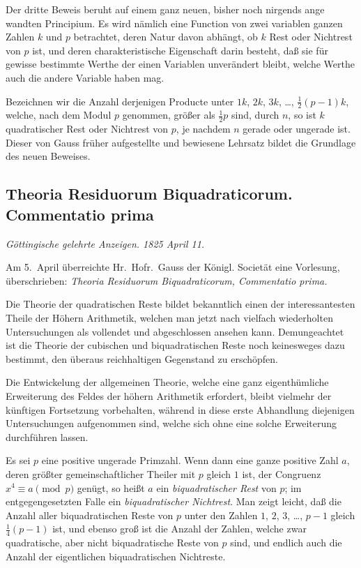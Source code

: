 \documentclass[12pt,a4paper]{article}
\theoremstyle{plain}
\theoremstyle{definition}
\theoremstyle{remark}
\begin{document}
Der dritte Beweis beruht auf einem ganz neuen, bisher noch nirgends ange wandten Principium. Es wird nämlich eine Function von zwei variablen ganzen Zahlen $k$ und $p$ betrachtet, deren Natur davon abhängt, ob $k$ Rest oder Nichtrest von $p$ ist, und deren charakteristische Eigenschaft darin besteht, daß sie für gewisse bestimmte Werthe der einen Variablen unverändert bleibt, welche Werthe auch die andere Variable haben mag.

Bezeichnen wir die Anzahl derjenigen Producte unter $1k$, $2k$, $3k$, \ldots, $\frac{1}{2}(p-1)k$, welche, nach dem Modul $p$ genommen, größer als $\frac{1}{2}p$ sind, durch $n$, so ist $k$ quadratischer Rest oder Nichtrest von $p$, je nachdem $n$ gerade oder ungerade ist. Dieser von Gauss früher aufgestellte und bewiesene Lehrsatz bildet die Grundlage des neuen Beweises.

\subsection*{Theoria Residuorum Biquadraticorum. Commentatio prima}

\textit{Göttingische gelehrte Anzeigen. 1825 April 11.}

Am 5.~April überreichte Hr.~Hofr.~Gauss der Königl. Societät eine Vorlesung, überschrieben: \textit{Theoria Residuorum Biquadraticorum, Commentatio prima.}

Die Theorie der quadratischen Reste bildet bekanntlich einen der interessantesten Theile der Höhern Arithmetik, welchen man jetzt nach vielfach wiederholten Untersuchungen als vollendet und abgeschlossen ansehen kann. Demungeachtet ist die Theorie der cubischen und biquadratischen Reste noch keinesweges dazu bestimmt, den überaus reichhaltigen Gegenstand zu erschöpfen.

Die Entwickelung der allgemeinen Theorie, welche eine ganz eigenthümliche Erweiterung des Feldes der höhern Arithmetik erfordert, bleibt vielmehr der künftigen Fortsetzung vorbehalten, während in diese erste Abhandlung diejenigen Untersuchungen aufgenommen sind, welche sich ohne eine solche Erweiterung durchführen lassen.

Es sei $p$ eine positive ungerade Primzahl. Wenn dann eine ganze positive Zahl $a$, deren größter gemeinschaftlicher Theiler mit $p$ gleich $1$ ist, der Congruenz $x^4 \equiv a \pmod{p}$ genügt, so heißt $a$ ein \textit{biquadratischer Rest} von $p$; im entgegengesetzten Falle ein \textit{biquadratischer Nichtrest}. Man zeigt leicht, daß die Anzahl aller biquadratischen Reste von $p$ unter den Zahlen $1$, $2$, $3$, \ldots, $p-1$ gleich $\frac{1}{4}(p-1)$ ist, und ebenso groß ist die Anzahl der Zahlen, welche zwar quadratische, aber nicht biquadratische Reste von $p$ sind, und endlich auch die Anzahl der eigentlichen biquadratischen Nichtreste.
\end{document}
